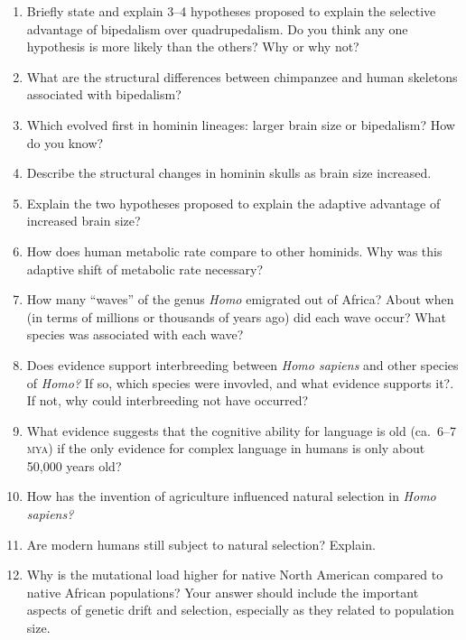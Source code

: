 \documentclass[letterpaper]{tufte-handout}
\begin{document}
\begin{enumerate}

	\item Briefly state and explain 3--4 hypotheses proposed to explain the selective advantage of bipedalism over quadrupedalism.  Do you think any one hypothesis is more likely than the others?  Why or why not?
	
	\item What are the structural differences between chimpanzee and human skeletons associated with bipedalism?

	\item Which evolved first in hominin lineages: larger brain size or bipedalism? How do you know?
	
	\item Describe the structural changes in hominin skulls as brain size increased.
	
	\item Explain the two hypotheses proposed to explain the adaptive advantage of increased brain size?
	
	\item How does human metabolic rate compare to other hominids. Why was this adaptive shift of metabolic rate necessary?

	\item How many “waves” of the genus \textit{Homo} emigrated out of Africa? About when (in terms of millions or thousands of years ago) did each wave occur? What species was associated with each wave?
	
	\item Does evidence support interbreeding between \textit{Homo sapiens} and other species of \textit{Homo?} If so, which species were invovled, and what evidence supports it?. If not, why could interbreeding not have occurred?
	
	\item What evidence suggests that the cognitive ability for language is old (ca.~6–7 \textsc{mya}) if the only evidence for complex language in humans is only about 50,000 years old?
	
	\item How has the invention of agriculture influenced natural selection in \textit{Homo sapiens?}
	
	\item Are modern humans still subject to natural selection? Explain.
	
	\item Why is the mutational load higher for native North American compared to native African populations? Your answer should include the important aspects of genetic drift and selection, especially as they related to population size.

\end{enumerate}
\end{document}
